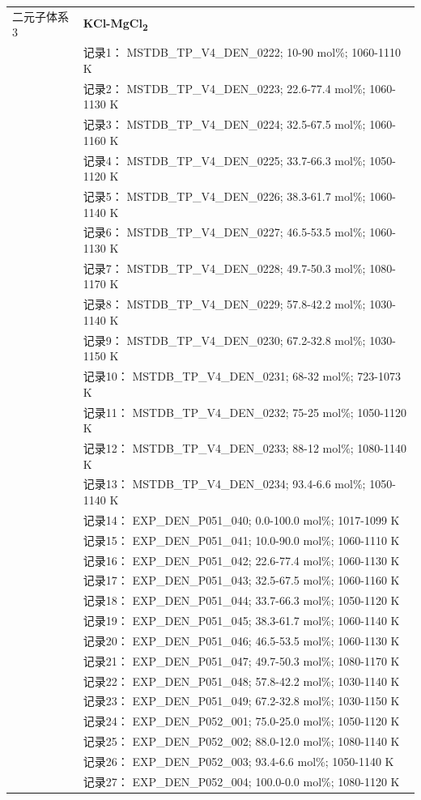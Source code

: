 \documentclass[12pt]{article}
\begin{document}
{\begin{longtable}[]{@{}
  >{\raggedright\arraybackslash}p{}
  >{\raggedright\arraybackslash}p{}@{}}
二元子体系 3  & \textbf{KCl-MgCl\textsubscript{2}} \\
 & 记录1： MSTDB\_TP\_V4\_DEN\_0222; 10-90 mol\%; 1060-1110 K \\
 & 记录2： MSTDB\_TP\_V4\_DEN\_0223; 22.6-77.4 mol\%; 1060-1130 K \\
 & 记录3： MSTDB\_TP\_V4\_DEN\_0224; 32.5-67.5 mol\%; 1060-1160 K \\
 & 记录4： MSTDB\_TP\_V4\_DEN\_0225; 33.7-66.3 mol\%; 1050-1120 K \\
 & 记录5： MSTDB\_TP\_V4\_DEN\_0226; 38.3-61.7 mol\%; 1060-1140 K \\
 & 记录6： MSTDB\_TP\_V4\_DEN\_0227; 46.5-53.5 mol\%; 1060-1130 K \\
 & 记录7： MSTDB\_TP\_V4\_DEN\_0228; 49.7-50.3 mol\%; 1080-1170 K \\
 & 记录8： MSTDB\_TP\_V4\_DEN\_0229; 57.8-42.2 mol\%; 1030-1140 K \\
 & 记录9： MSTDB\_TP\_V4\_DEN\_0230; 67.2-32.8 mol\%; 1030-1150 K \\
 & 记录10： MSTDB\_TP\_V4\_DEN\_0231; 68-32 mol\%; 723-1073 K \\
 & 记录11： MSTDB\_TP\_V4\_DEN\_0232; 75-25 mol\%; 1050-1120 K \\
 & 记录12： MSTDB\_TP\_V4\_DEN\_0233; 88-12 mol\%; 1080-1140 K \\
 & 记录13： MSTDB\_TP\_V4\_DEN\_0234; 93.4-6.6 mol\%; 1050-1140 K \\
 & 记录14： EXP\_DEN\_P051\_040; 0.0-100.0 mol\%; 1017-1099 K \\
 & 记录15： EXP\_DEN\_P051\_041; 10.0-90.0 mol\%; 1060-1110 K \\
 & 记录16： EXP\_DEN\_P051\_042; 22.6-77.4 mol\%; 1060-1130 K \\
 & 记录17： EXP\_DEN\_P051\_043; 32.5-67.5 mol\%; 1060-1160 K \\
 & 记录18： EXP\_DEN\_P051\_044; 33.7-66.3 mol\%; 1050-1120 K \\
 & 记录19： EXP\_DEN\_P051\_045; 38.3-61.7 mol\%; 1060-1140 K \\
 & 记录20： EXP\_DEN\_P051\_046; 46.5-53.5 mol\%; 1060-1130 K \\
 & 记录21： EXP\_DEN\_P051\_047; 49.7-50.3 mol\%; 1080-1170 K \\
 & 记录22： EXP\_DEN\_P051\_048; 57.8-42.2 mol\%; 1030-1140 K \\
 & 记录23： EXP\_DEN\_P051\_049; 67.2-32.8 mol\%; 1030-1150 K \\
 & 记录24： EXP\_DEN\_P052\_001; 75.0-25.0 mol\%; 1050-1120 K \\
 & 记录25： EXP\_DEN\_P052\_002; 88.0-12.0 mol\%; 1080-1140 K \\
 & 记录26： EXP\_DEN\_P052\_003; 93.4-6.6 mol\%; 1050-1140 K \\
 & 记录27： EXP\_DEN\_P052\_004; 100.0-0.0 mol\%; 1080-1120 K  \\


\end{longtable}}
\end{document}

